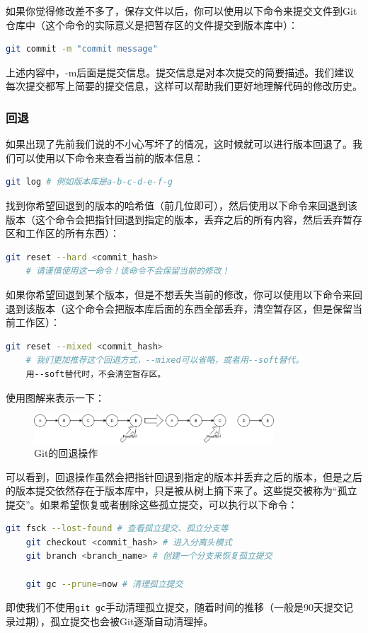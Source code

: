 \documentclass[../main.tex]{subfiles}
\begin{document}
如果你觉得修改差不多了，保存文件以后，你可以使用以下命令来提交文件到Git仓库中（这个命令的实际意义是把暂存区的文件提交到版本库中）：

\begin{lstlisting}[language=bash]
    git commit -m "commit message"
\end{lstlisting}

上述内容中，-m后面是提交信息。提交信息是对本次提交的简要描述。我们建议每次提交都写上简要的提交信息，这样可以帮助我们更好地理解代码的修改历史。

\subsubsection{回退}

如果出现了先前我们说的不小心写坏了的情况，这时候就可以进行版本回退了。我们可以使用以下命令来查看当前的版本信息：

\begin{lstlisting}[language=bash]
    git log # 例如版本库是a-b-c-d-e-f-g
\end{lstlisting}

找到你希望回退到的版本的哈希值（前几位即可），然后使用以下命令来回退到该版本（这个命令会把指针回退到指定的版本，丢弃之后的所有内容，然后丢弃暂存区和工作区的所有东西）：

\begin{lstlisting}[language=bash]
    git reset --hard <commit_hash> 
    # 请谨慎使用这一命令！该命令不会保留当前的修改！
\end{lstlisting}

如果你希望回退到某个版本，但是不想丢失当前的修改，你可以使用以下命令来回退到该版本（这个命令会把版本库后面的东西全部丢弃，清空暂存区，但是保留当前工作区）：
\begin{lstlisting}[language=bash]
    git reset --mixed <commit_hash> 
    # 我们更加推荐这个回退方式，--mixed可以省略，或者用--soft替代。
    用--soft替代时，不会清空暂存区。
\end{lstlisting}

使用图解来表示一下：
\begin{figure}[htbp]
\centering
\includegraphics[width=0.8\textwidth]{images/git-reset.png}
\caption{Git的回退操作}
\label{fig:git-reset}
\end{figure}
可以看到，回退操作虽然会把指针回退到指定的版本并丢弃之后的版本，但是之后的版本提交依然存在于版本库中，只是被从树上摘下来了。这些提交被称为“孤立提交”。如果希望恢复或者删除这些孤立提交，可以执行以下命令：
\begin{lstlisting}[language=bash]
    git fsck --lost-found # 查看孤立提交、孤立分支等
    git checkout <commit_hash> # 进入分离头模式
    git branch <branch_name> # 创建一个分支来恢复孤立提交

    git gc --prune=now # 清理孤立提交
\end{lstlisting}
即使我们不使用\texttt{git gc}手动清理孤立提交，随着时间的推移（一般是90天提交记录过期），孤立提交也会被Git逐渐自动清理掉。
\end{document}

